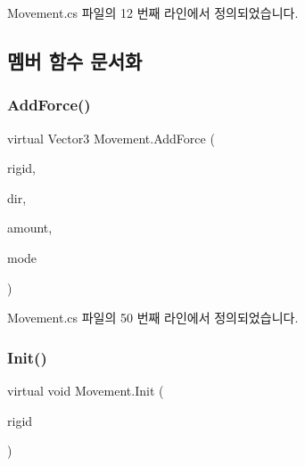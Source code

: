 Movement.\+cs 파일의 12 번째 라인에서 정의되었습니다.



\subsection{멤버 함수 문서화}
\mbox{\label{class_movement_ab0b20a2f058e2eed15f4bdf0503a2566}} 
\subsubsection{\texorpdfstring{AddForce()}{AddForce()}}
{\footnotesize\ttfamily virtual Vector3 Movement.\+Add\+Force (\begin{DoxyParamCaption}\item[{Rigidbody2D}]{rigid,  }\item[{Vector3}]{dir,  }\item[{float}]{amount,  }\item[{Force\+Mode2D}]{mode }\end{DoxyParamCaption})\hspace{0.3cm}{\ttfamily [virtual]}}



Movement.\+cs 파일의 50 번째 라인에서 정의되었습니다.


\begin{DoxyCode}{0}

\end{DoxyCode}
\mbox{\label{class_movement_a1c50c07edbe274e1cf55253e87506684}} 
\subsubsection{\texorpdfstring{Init()}{Init()}}
{\footnotesize\ttfamily virtual void Movement.\+Init (\begin{DoxyParamCaption}\item[{Rigidbody2D}]{rigid }\end{DoxyParamCaption})\hspace{0.3cm}{\ttfamily [virtual]}}



